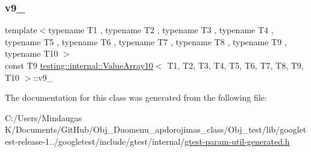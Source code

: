 \mbox{\label{classtesting_1_1internal_1_1_value_array10_afb3a5170d6ecc337f35a5fe53aa98001}} 
\subsubsection{\texorpdfstring{v9\_}{v9\_}}
{\footnotesize\ttfamily template$<$typename T1 , typename T2 , typename T3 , typename T4 , typename T5 , typename T6 , typename T7 , typename T8 , typename T9 , typename T10 $>$ \\
const T9 \mbox{\hyperlink{classtesting_1_1internal_1_1_value_array10}{testing\+::internal\+::\+Value\+Array10}}$<$ T1, T2, T3, T4, T5, T6, T7, T8, T9, T10 $>$\+::v9\+\_\+\hspace{0.3cm}{\ttfamily [private]}}



The documentation for this class was generated from the following file\+:\begin{DoxyCompactItemize}
\item 
C\+:/\+Users/\+Mindaugas K/\+Documents/\+Git\+Hub/\+Obj\+\_\+\+Duomenu\+\_\+apdorojimas\+\_\+class/\+Obj\+\_\+test/lib/googletest-\/release-\/1../googletest/include/gtest/internal/\mbox{\hyperlink{gtest-param-util-generated_8h}{gtest-\/param-\/util-\/generated.\+h}}\end{DoxyCompactItemize}
